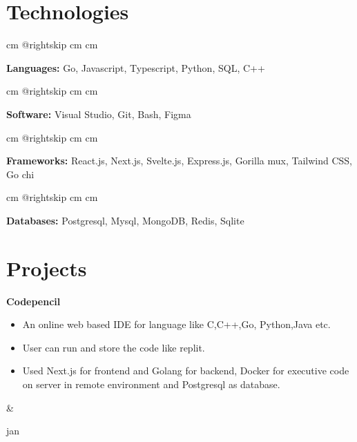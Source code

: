 \documentclass[10pt, letterpaper]{article}
\newenvironment{highlights}{
        \begin{itemize}[
                topsep=0pt,
                parsep=0.10 cm,
                partopsep=0pt,
                itemsep=0pt,
                after=\vspace{-1\baselineskip},
                leftmargin=0.4 cm + 3pt
            ]
    }{
        \end{itemize}
    } %
\let\originalTabularx\tabularx
\let\originalEndTabularx\endtabularx
\renewenvironment{tabularx}{\bgroup\centering\originalTabularx}{\originalEndTabularx\par\egroup}
\begin{document}
    

                \section{Technologies}

        \begingroup{} cm
        \advance\csname @rightskip cm
        \advance{} cm

        \textbf{Languages:} Go, Javascript, Typescript, Python, SQL, C++ \par\endgroup

        \vspace{0.2 cm}
        \begingroup{} cm
        \advance\csname @rightskip cm
        \advance{} cm

        \textbf{Software:} Visual Studio, Git, Bash, Figma\par\endgroup

        \vspace{0.2 cm}
        \begingroup{} cm
        \advance\csname @rightskip cm
        \advance{} cm

        \textbf{Frameworks: } React.js, Next.js, Svelte.js, Express.js, Gorilla mux, Tailwind CSS, Go chi
        \par\endgroup

        

        \vspace{0.2 cm}
        \begingroup{} cm
        \advance\csname @rightskip cm
        \advance{} cm

        \textbf{Databases:} Postgresql, Mysql, MongoDB, Redis, Sqlite \par\endgroup
        
        
    
    


    
    \section{Projects}

        \begin{tabularx}{
            \textwidth-0.4 cm-0.13cm
        }{
            K{0.2 cm}
            R{4.1 cm}
        }
            \textbf{Codepencil}

            \vspace{0.10 cm}

            \begin{highlights}
                \item An online web based IDE for language like C,C++,Go, Python,Java etc.
                \item User can run and store the code like replit.
                \item Used Next.js for frontend and Golang for backend, Docker for executive code on server in remote environment and Postgresql as database.
            \end{highlights}
            &
            

            jan 
        \end{tabularx}
\end{document}

